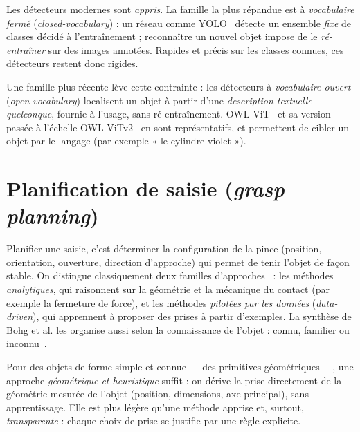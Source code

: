 Les détecteurs modernes sont \emph{appris}. La famille la plus répandue est à \emph{vocabulaire fermé} (\emph{closed-vocabulary}) : un réseau comme YOLO~\cite{redmon_yolo_2016} détecte un ensemble \emph{fixe} de classes décidé à l'entraînement ; reconnaître un nouvel objet impose de le \emph{ré-entraîner} sur des images annotées. Rapides et précis sur les classes connues, ces détecteurs restent donc rigides.

Une famille plus récente lève cette contrainte : les détecteurs à \emph{vocabulaire ouvert} (\emph{open-vocabulary}) localisent un objet à partir d'une \emph{description textuelle quelconque}, fournie à l'usage, sans ré-entraînement. OWL-ViT~\cite{minderer_owlvit_2022} et sa version passée à l'échelle OWL-ViTv2~\cite{minderer_owlv2_2023} en sont représentatifs, et permettent de cibler un objet par le langage (par exemple « le cylindre violet »).


\section{Planification de saisie (\textit{grasp planning})}

Planifier une saisie, c'est déterminer la configuration de la pince (position, orientation, ouverture, direction d'approche) qui permet de tenir l'objet de façon stable. On distingue classiquement deux familles d'approches~\cite{bohg_data-driven_2014} : les méthodes \emph{analytiques}, qui raisonnent sur la géométrie et la mécanique du contact (par exemple la fermeture de force), et les méthodes \emph{pilotées par les données} (\emph{data-driven}), qui apprennent à proposer des prises à partir d'exemples. La synthèse de Bohg et al. les organise aussi selon la connaissance de l'objet : connu, familier ou inconnu~\cite{bohg_data-driven_2014}.

Pour des objets de forme simple et connue --- des primitives géométriques ---, une approche \emph{géométrique et heuristique} suffit : on dérive la prise directement de la géométrie mesurée de l'objet (position, dimensions, axe principal), sans apprentissage. Elle est plus légère qu'une méthode apprise et, surtout, \emph{transparente} : chaque choix de prise se justifie par une règle explicite.

